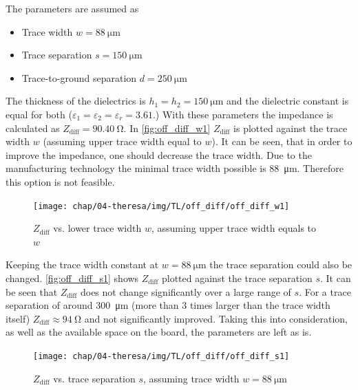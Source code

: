 The parameters are assumed as
\begin{itemize}
	\item Trace width $w = \SI{88}{\micro \meter}$ 
	\item Trace separation $s = \SI{150}{\micro \meter}$
	\item Trace-to-ground separation $d = \SI{250}{\micro \meter}$
\end{itemize}
The thickness of the dielectrics is $h_1 = h_2 = \SI{150}{\micro \meter}$  and the dielectric constant is equal for both ($\varepsilon_1 = \varepsilon_2 = \varepsilon_r = 3.61$.)
With these parameters the impedance is calculated as $Z_\text{diff} = \SI{90.40}{\ohm}$.
In \autoref{fig:off_diff_w1} $Z_\text{diff}$ is plotted against the trace width $w$ (assuming upper trace width equal to $w$). It can be seen, that in order to improve the impedance, one should decrease the trace width. 
Due to the manufacturing technology the minimal trace width possible is \SI{88}{\micro \meter}. 
Therefore this option is not feasible.

\begin{figure}[tb]
	\centering
	\texttt{[image: chap/04-theresa/img/TL/off\_diff/off\_diff\_w1]}
	\caption[DOWG, $Z_\text{diff}$ vs. $w$]{$Z_\text{diff}$ vs. lower trace width $w$, assuming upper trace width equals to $w$}
	\label{fig:off_diff_w1}
\end{figure}

Keeping the trace width constant at $w = \SI{88}{\micro \meter}$ the trace separation could also be changed.
\autoref{fig:off_diff_s1} shows $Z_\text{diff}$ plotted against the trace separation $s$.
It can be seen that $Z_\text{diff}$ does not change significantly over a large range of $s$.
For a trace separation of around \SI{300}{\micro \meter} (more than 3 times larger than the trace width itself) $Z_\text{diff} \approx \SI{94}{\ohm}$ and not significantly improved.
Taking this into consideration, as well as the available space on the board, the parameters are left as is.  
\begin{figure}[tb]
	\centering
	\texttt{[image: chap/04-theresa/img/TL/off\_diff/off\_diff\_s1]}
	\caption[DOWG, $Z_\text{diff}$ vs. $s$]{$Z_\text{diff}$ vs. trace separation $s$, assuming trace width $w = \SI{88}{\micro \meter}$}
	\label{fig:off_diff_s1}
\end{figure}

